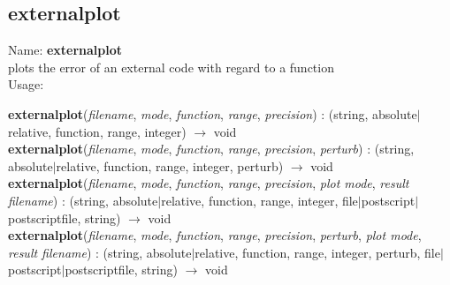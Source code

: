 \subsection{externalplot}
\label{labexternalplot}
\noindent Name: \textbf{externalplot}\\
plots the error of an external code with regard to a function\\
\noindent Usage: 
\begin{center}
\textbf{externalplot}(\emph{filename}, \emph{mode}, \emph{function}, \emph{range}, \emph{precision}) : (\textsf{string}, \textsf{absolute$|$relative}, \textsf{function}, \textsf{range}, \textsf{integer}) $\rightarrow$ \textsf{void}\\
\textbf{externalplot}(\emph{filename}, \emph{mode}, \emph{function}, \emph{range}, \emph{precision}, \emph{perturb}) : (\textsf{string}, \textsf{absolute$|$relative}, \textsf{function}, \textsf{range}, \textsf{integer}, \textsf{perturb}) $\rightarrow$ \textsf{void}\\
\textbf{externalplot}(\emph{filename}, \emph{mode}, \emph{function}, \emph{range}, \emph{precision}, \emph{plot mode}, \emph{result filename}) : (\textsf{string}, \textsf{absolute$|$relative}, \textsf{function}, \textsf{range}, \textsf{integer}, \textsf{file$|$postscript$|$postscriptfile}, \textsf{string}) $\rightarrow$ \textsf{void}\\
\textbf{externalplot}(\emph{filename}, \emph{mode}, \emph{function}, \emph{range}, \emph{precision}, \emph{perturb}, \emph{plot mode}, \emph{result filename}) : (\textsf{string}, \textsf{absolute$|$relative}, \textsf{function}, \textsf{range}, \textsf{integer}, \textsf{perturb}, \textsf{file$|$postscript$|$postscriptfile}, \textsf{string}) $\rightarrow$ \textsf{void}\\
\end{center}
